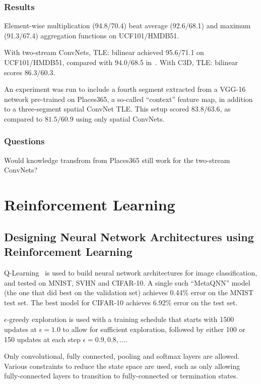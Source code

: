 \documentclass[a4paper, 12pt]{article}
\begin{document}
\subsubsection{Results}

Element-wise multiplication (94.8/70.4) beat average (92.6/68.1) and maximum
(91.3/67.4) aggregation functions on UCF101/HMDB51.

With two-stream ConvNets, TLE\@: bilinear achieved 95.6/71.1 on UCF101/HMDB51,
compared with $94.0/68.5$ in~\citet{DBLP:journals/corr/WangXW0LTG16}. With C3D,
TLE\@: bilinear scores $86.3/60.3$.

An experiment was run to include a fourth segment extracted from a VGG-16
network pre-trained on Places365, a so-called ``context'' feature map, in
addition to a three-segment spatial ConvNet TLE\@. This setup scored
$83.8/63.6$, as compared to $81.5/60.9$ using only spatial ConvNets\@.

\subsubsection{Questions}

Would knowledge transfrom from Places365 still work for the two-stream
ConvNets?


\section{Reinforcement Learning}


\subsection{Designing Neural Network Architectures using Reinforcement
            Learning~\citet{DBLP:journals/corr/BakerGNR16}}

Q-Learning~\citet{Watkins1992} is used to build neural network architectures for
image classification, and tested on MNIST, SVHN and CIFAR-10. A single such
``MetaQNN'' model (the one that did best on the validation set) achieves 0.44\%
error on the MNIST test set. The best model for CIFAR-10 achieves 6.92\% error
on the test set.

$\epsilon$-greedy exploration is used with a training schedule that starts with
\num{1500} updates at $\epsilon = 1.0$ to allow for sufficient exploration,
followed by either \num{100} or \num{150} updates at each step
$\epsilon = 0.9, 0.8, \dots$.

Only convolutional, fully connected, pooling and softmax layers are allowed.
Various constraints to reduce the state space are used, such as only allowing
fully-connected layers to transition to fully-connected or termination states.
\end{document}
